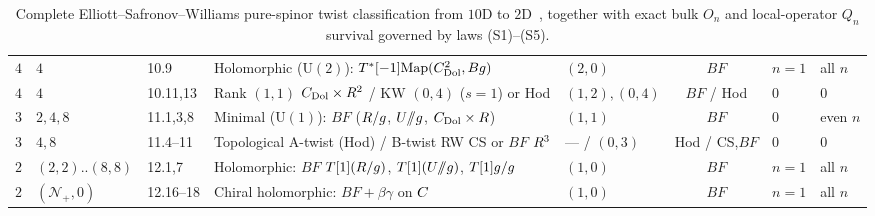 \begin{table}[H]
\begin{tabularx}{\textwidth}{@{}rll>{\raggedright\arraybackslash}Xlcll@{}}
$4$ & $4$ & 10.9 & Holomorphic ($\mathrm{U}(2)$): $T^*[-1]\mathrm{Map}(C^2_{\mathrm{Dol}},Bg)$ & $(2,0)$ & $BF$ & $n=1$ & all $n$ \\
$4$ & $4$ & 10.11,13 & Rank $(1,1)$ $C_{\mathrm{Dol}}\times R^2$ / KW $(0,4)$ ($s=1$) or Hod & $(1,2),(0,4)$ & $BF$ / Hod & $0$ & $0$ \\
$3$ & $2, 4, 8$ & 11.1,3,8 & Minimal ($\mathrm{U}(1)$): $BF$ ($R/g$, $U/\mkern-6mu/g$, $C_{\mathrm{Dol}}\times R$) & $(1,1)$ & $BF$ & $0$ & even $n$ \\
$3$ & $4, 8$ & 11.4--11 & Topological A-twist (Hod) / B-twist RW CS or $BF$ $R^3$ & --- / $(0,3)$ & Hod / CS,$BF$ & $0$ & $0$ \\
$2$ & $(2,2)$..$(8,8)$ & 12.1,7 & Holomorphic: $BF$ $T[1](R/g)$, $T[1](U/\mkern-6mu/g)$, $T[1]g/g$ & $(1,0)$ & $BF$ & $n=1$ & all $n$ \\
$2$ & $(\mathcal{N}_+,0)$ & 12.16--18 & Chiral holomorphic: $BF + \beta\gamma$ on $C$ & $(1,0)$ & $BF$ & $n=1$ & all $n$ \\
\bottomrule
\end{tabularx}
\caption{Complete Elliott--Safronov--Williams pure-spinor twist classification from $10\mathrm{D}$ to $2\mathrm{D}$~\cite{ESW,Repo9e833c8}, together with exact bulk $O_n$ and local-operator $Q_n$ survival governed by laws (S1)--(S5).}
\label{tab:esw-full-taxonomy}
\end{table}

